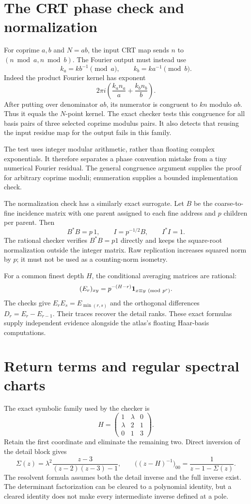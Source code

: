 \clearpage
\section{The CRT phase check and normalization}\label{a-verify-crt}

For coprime \(a,b\) and \(N=ab\), the input CRT map sends \(n\) to \((n\bmod a,n\bmod b)\). The Fourier output must instead use
\[
 k_a=kb^{-1}\pmod a,\qquad
 k_b=ka^{-1}\pmod b.
\]
Indeed the product Fourier kernel has exponent
\[
 2\pi i\left(\frac{k_an_a}{a}+\frac{k_bn_b}{b}\right).
\]
After putting over denominator \(ab\), its numerator is congruent to \(kn\) modulo \(ab\). Thus it equals the \(N\)-point kernel. The exact checker tests this congruence for all basis pairs of three selected coprime modulus pairs. It also detects that reusing the input residue map for the output fails in this family.

The test uses integer modular arithmetic, rather than floating complex exponentials. It therefore separates a phase convention mistake from a tiny numerical Fourier residual. The general congruence argument supplies the proof for arbitrary coprime moduli; enumeration supplies a bounded implementation check.

The normalization check has a similarly exact surrogate. Let \(B\) be the coarse-to-fine incidence matrix with one parent assigned to each fine address and \(p\) children per parent. Then
\[
 B^*B=p\,1,
 \qquad I=p^{-1/2}B,
 \qquad I^*I=1.
\]
The rational checker verifies \(B^*B=p1\) directly and keeps the square-root normalization outside the integer matrix. Raw replication increases squared norm by \(p\); it must not be used as a counting-norm isometry.

For a common finest depth \(H\), the conditional averaging matrices are rational:
\[
 (E_r)_{xy}=p^{-(H-r)}
 \mathbf1_{x\equiv y\ ({\rm mod}\ p^r)}.
\]
The checks give \(E_rE_s=E_{\min(r,s)}\) and the orthogonal differences \(D_r=E_r-E_{r-1}\). Their traces recover the detail ranks. These exact formulas supply independent evidence alongside the atlas's floating Haar-basis computations.

\clearpage
\section{Return terms and regular spectral charts}\label{a-verify-schur}

The exact symbolic family used by the checker is
\[
 H=\begin{pmatrix}
 1&\lambda&0\\ \lambda&2&1\\0&1&3
 \end{pmatrix}.
\]
Retain the first coordinate and eliminate the remaining two. Direct inversion of the detail block gives
\[
 \Sigma(z)=\lambda^2
 \frac{z-3}{(z-2)(z-3)-1},
 \qquad
 \bigl((z-H)^{-1}\bigr)_{00}
 =\frac1{z-1-\Sigma(z)}.
\]
The resolvent formula assumes both the detail inverse and the full inverse exist. The determinant factorization can be cleared to a polynomial identity, but a cleared identity does not make every intermediate inverse defined at a pole.

